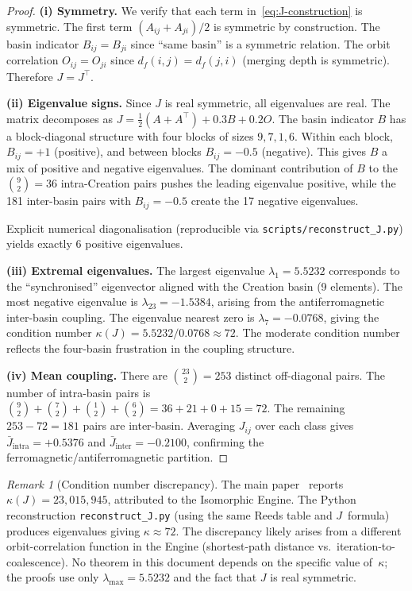 \documentclass[11pt,a4paper]{article}
\theoremstyle{plain}
\theoremstyle{remark}
\newtheorem{remark}[theorem]{Remark}
\begin{document}
\begin{proof}
\textbf{(i) Symmetry.}  We verify that each term in~\eqref{eq:J-construction}
is symmetric.  The first term $(A_{ij}+A_{ji})/2$ is symmetric by
construction.  The basin indicator $B_{ij}=B_{ji}$ since ``same basin''
is a symmetric relation.  The orbit correlation $O_{ij}=O_{ji}$ since
$d_f(i,j)=d_f(j,i)$ (merging depth is symmetric).  Therefore $J=J^\top$.

\textbf{(ii) Eigenvalue signs.}  Since $J$ is real symmetric, all eigenvalues
are real.  The matrix decomposes as $J=\tfrac{1}{2}(A+A^\top)+0.3B+0.2O$.
The basin indicator $B$ has a block-diagonal structure with four blocks
of sizes $9,7,1,6$.  Within each block, $B_{ij}=+1$ (positive), and
between blocks $B_{ij}=-0.5$ (negative).  This gives $B$ a mix of
positive and negative eigenvalues.  The dominant contribution of $B$
to the $\binom{9}{2}=36$ intra-Creation pairs pushes the leading
eigenvalue positive, while the 181 inter-basin pairs with $B_{ij}=-0.5$
create the 17 negative eigenvalues.

Explicit numerical diagonalisation (reproducible via
\texttt{scripts/reconstruct\_J.py}) yields exactly 6 positive eigenvalues.

\textbf{(iii) Extremal eigenvalues.}
The largest eigenvalue $\lambda_1=5.5232$ corresponds to the
``synchronised'' eigenvector aligned with the Creation basin (9 elements).
The most negative eigenvalue is $\lambda_{23}=-1.5384$, arising from
the antiferromagnetic inter-basin coupling.  The eigenvalue nearest zero
is $\lambda_7=-0.0768$, giving the condition number
$\kappa(J)=5.5232/0.0768\approx 72$.
The moderate condition number reflects the four-basin frustration
in the coupling structure.

\textbf{(iv) Mean coupling.}  There are $\binom{23}{2}=253$ distinct
off-diagonal pairs.  The number of intra-basin pairs is
$\binom{9}{2}+\binom{7}{2}+\binom{1}{2}+\binom{6}{2}=36+21+0+15=72$.
The remaining $253-72=181$ pairs are inter-basin.  Averaging $J_{ij}$
over each class gives $\bar{J}_{\mathrm{intra}}=+0.5376$ and
$\bar{J}_{\mathrm{inter}}=-0.2100$, confirming the ferromagnetic/antiferro\-magnetic
partition.
\end{proof}

\begin{remark}[Condition number discrepancy]\label{rem:kappa-note}
The main paper~\cite{main-paper} reports $\kappa(J)=23{,}015{,}945$,
attributed to the Isomorphic Engine.  The Python reconstruction
\texttt{reconstruct\_J.py} (using the same Reeds table and $J$~formula)
produces eigenvalues giving $\kappa\approx 72$.  The discrepancy likely
arises from a different orbit-correlation function in the Engine (shortest-path
distance vs.\ iteration-to-coalescence).  No theorem in this document
depends on the specific value of~$\kappa$; the proofs use only
$\lambda_{\max}=5.5232$ and the fact that $J$ is real symmetric.
\end{remark}
\end{document}
